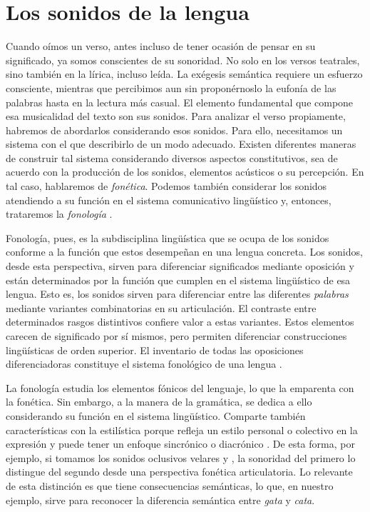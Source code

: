 \section{Los sonidos de la lengua}
Cuando oímos un verso, antes incluso de tener ocasión  de pensar en su significado, ya somos conscientes de su sonoridad. No solo en los versos teatrales, sino también en la lírica, incluso leída. La exégesis semántica requiere un esfuerzo consciente, mientras que percibimos aun sin proponérnoslo la eufonía de las palabras hasta en la lectura más casual. El elemento fundamental que compone esa musicalidad del texto son sus sonidos. Para analizar el verso propiamente, habremos de abordarlos considerando esos sonidos. Para ello, necesitamos un sistema con el que describirlo de un modo adecuado. Existen diferentes maneras de construir tal sistema considerando diversos aspectos constitutivos, sea de acuerdo con la producción de los sonidos, elementos acústicos o su percepción. En tal caso, hablaremos de \textit{fonética}. Podemos también considerar los sonidos atendiendo a su función en el sistema comunicativo lingüístico y, entonces, trataremos la \textit{fonología} \parencite[23]{quilis2019}.

Fonología, pues, es la subdisciplina lingüística que se ocupa de los sonidos conforme a la función que estos desempeñan en una lengua concreta. Los sonidos, desde esta perspectiva, sirven para diferenciar significados mediante oposición y están determinados por la función que cumplen en el sistema lingüístico de esa lengua. Esto es, los sonidos sirven para diferenciar entre las diferentes \textit{palabras} mediante variantes combinatorias en su articulación. El contraste entre determinados rasgos distintivos confiere valor a estas variantes. 
Estos elementos carecen de significado por sí mismos, pero permiten diferenciar construcciones lingüísticas de orden superior. El inventario de todas las oposiciones diferenciadoras constituye el sistema fonológico de una lengua \parencite[231]{jakobson1962a}.

La fonología estudia los elementos fónicos del lenguaje, lo que la emparenta con la fonética. Sin embargo, a la manera de la gramática, se dedica a ello considerando su función en el sistema lingüístico. Comparte también características con la estilística porque refleja un estilo personal o colectivo en la expresión y puede tener un enfoque sincrónico o diacrónico \parencite[35]{alarcos1964}. De esta forma, por ejemplo, si tomamos los sonidos oclusivos velares \ipa{[g]} y \ipa{[k]}, la sonoridad del primero lo distingue del segundo desde una perspectiva fonética articulatoria. Lo relevante de esta distinción es que tiene consecuencias semánticas, lo que, en nuestro ejemplo, sirve para reconocer la diferencia semántica entre \textit{gata} y \textit{cata}.

